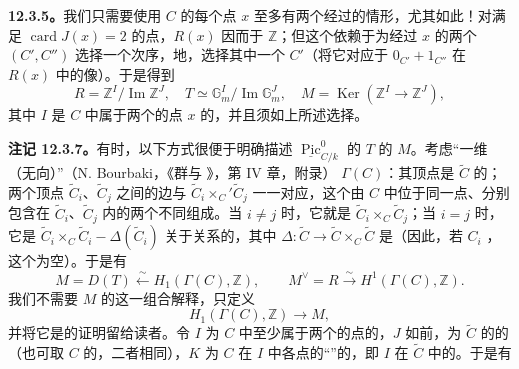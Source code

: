 \textbf{12.3.5。}我们只需要使用 $C$ 的每个点 $x$ 至多有两个经过的情形，尤其如此！对满足 $\operatorname{card}J(x)=2$ 的点，$R(x)$ 因而于 $\mathbb Z$；但这个依赖于为经过 $x$ 的两个 $(C',C'')$ 选择一个次序，地，选择其中一个 $C'$（将它对应于 $0_{C'}+1_{C''}$ 在 $R(x)$ 中的像）。于是得到
\[
 R=\mathbb Z^I/\operatorname{Im}\mathbb Z^J,\quad
 T\simeq\mathbb G_m^I/\operatorname{Im}\mathbb G_m^J,\quad
 M=\operatorname{Ker}(\mathbb Z^I\longrightarrow\mathbb Z^J),\tag{12.3.6}
\]
其中 $I$ 是 $C$ 中属于两个的点 $x$ 的，并且须如上所述选择。

\textbf{注记 12.3.7。}有时，以下方式很便于明确描述 $\underline{\operatorname{Pic}}_{C/k}^0$ 的 $T$ 的 $M$。考虑“一维（无向）”（N. Bourbaki，《群与 》，第 IV 章，附录）
$\Gamma(C)$：其顶点是 $\widetilde C$ 的；两个顶点 $\widetilde C_i$、$\widetilde C_j$ 之间的边与 $\widetilde C_i\mathbin{\times_C'}\widetilde C_j$ 一一对应，这个由 $C$ 中位于同一点、分别包含在 $\widetilde C_i$、$\widetilde C_j$ 内的两个不同组成。当 $i\ne j$ 时，它就是 $\widetilde C_i\times_C\widetilde C_j$；当 $i=j$ 时，它是
$\widetilde C_i\times_C\widetilde C_i-\Delta(\widetilde C_i)$ 关于关系的，其中 $\Delta:\widetilde C\to\widetilde C\times_C\widetilde C$ 是（因此，若 $C_i$ ，这个为空）。于是有
\[
 M=D(T)\xleftarrow\sim H_1(\Gamma(C),\mathbb Z),\qquad
 M^\vee=R\xrightarrow\sim H^1(\Gamma(C),\mathbb Z).\tag{12.3.7}
\]
我们不需要 $M$ 的这一组合解释，只定义
\[
 H_1(\Gamma(C),\mathbb Z)\longrightarrow M,
\]
并将它是的证明留给读者。令 $I$ 为 $C$ 中至少属于两个的点的，$J$ 如前，为 $\widetilde C$ 的的（也可取 $C$ 的，二者相同），$K$ 为 $C$ 在 $I$ 中各点的“”的，即 $I$ 在 $\widetilde C$ 中的。于是有
